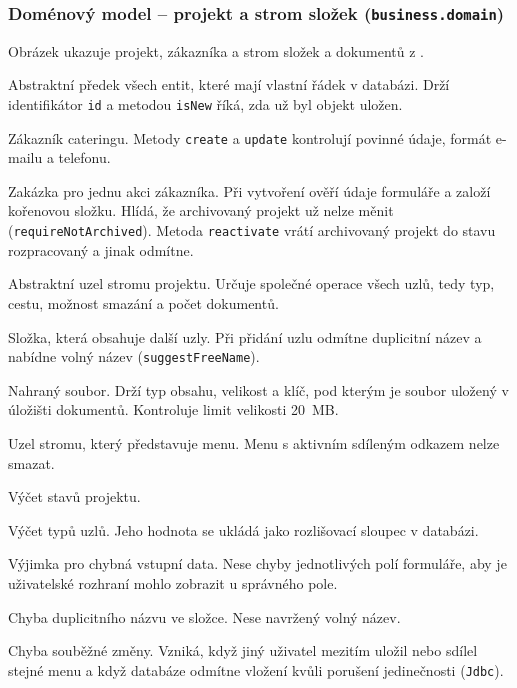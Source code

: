 \subsubsection*{Doménový model -- projekt a strom složek (\texttt{business.domain})}

Obrázek  ukazuje projekt, zákazníka a strom složek a dokumentů z .

\begin{description}[itemsep=2pt,style=unboxed]
  \item[\texttt{DomainObject}] Abstraktní předek všech entit, které mají vlastní řádek v databázi. Drží identifikátor \texttt{id} a metodou \texttt{isNew} říká, zda už byl objekt uložen.
  \item[\texttt{Customer}] Zákazník cateringu. Metody \texttt{create} a \texttt{update} kontrolují povinné údaje, formát e-mailu a telefonu.
  \item[\texttt{Project}] Zakázka pro jednu akci zákazníka. Při vytvoření ověří údaje formuláře a založí kořenovou složku. Hlídá, že archivovaný projekt už nelze měnit (\texttt{requireNotArchived}). Metoda \texttt{reactivate} vrátí archivovaný projekt do stavu rozpracovaný a jinak odmítne.
  \item[\texttt{ProjectNode}] Abstraktní uzel stromu projektu. Určuje společné operace všech uzlů, tedy typ, cestu, možnost smazání a počet dokumentů.
  \item[\texttt{Folder}] Složka, která obsahuje další uzly. Při přidání uzlu odmítne duplicitní název a nabídne volný název (\texttt{suggestFreeName}).
  \item[\texttt{Document}] Nahraný soubor. Drží typ obsahu, velikost a klíč, pod kterým je soubor uložený v úložišti dokumentů. Kontroluje limit velikosti 20~MB.
  \item[\texttt{Menu}] Uzel stromu, který představuje menu. Menu s aktivním sdíleným odkazem nelze smazat.
  \item[\texttt{ProjectStatus}] Výčet stavů projektu.
  \item[\texttt{NodeType}] Výčet typů uzlů. Jeho hodnota se ukládá jako rozlišovací sloupec v databázi.
  \item[\texttt{ValidationException}] Výjimka pro chybná vstupní data. Nese chyby jednotlivých polí formuláře, aby je uživatelské rozhraní mohlo zobrazit u správného pole.
  \item[\texttt{DuplicateNameException}] Chyba duplicitního názvu ve složce. Nese navržený volný název.
  \item[\texttt{ConflictException}] Chyba souběžné změny. Vzniká, když jiný uživatel mezitím uložil nebo sdílel stejné menu a když databáze odmítne vložení kvůli porušení jedinečnosti (\texttt{Jdbc}).
\end{description}

